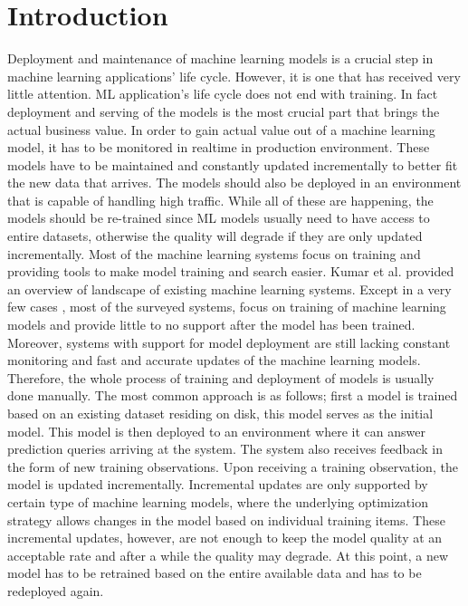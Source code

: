 \documentclass{vldb}
\begin{document}
\section{Introduction} \label{introduction}
Deployment and maintenance of machine learning models is a crucial step in machine learning applications' life cycle. 
However, it is one that has received very little attention. 
ML application's life cycle does not end with training. 
In fact deployment and serving of the models is the most crucial part that brings the actual business value. 
In order to gain actual value out of a machine learning model, it has to be monitored in realtime in production environment. 
These models have to be maintained and constantly updated incrementally to better fit the new data that arrives. 
The models should also be deployed in an environment that is capable of handling high traffic. 
While all of these are happening, the models should be re-trained since ML models usually need to have access to entire datasets, otherwise the quality will degrade if they are only updated incrementally. 
Most of the machine learning systems focus on training and providing tools to make model training and search easier. 
Kumar et al. \cite{kumar2015survey} provided an overview of landscape of existing machine learning systems. 
Except in a very few cases \cite{akdere2011case, crankshaw2014missing}, most of the surveyed systems, focus on training of machine learning models and provide little to no support after the model has been trained.
Moreover, systems with support for model deployment are still lacking constant monitoring and fast and accurate updates of the machine learning models.
Therefore, the whole process of training and deployment of models is usually done manually.
The most common approach is as follows; first a model is trained based on an existing dataset residing on disk, this model serves as the initial model.
This model is then deployed to an environment where it can answer prediction queries arriving at the system.
The system also receives feedback in the form of new training observations.
Upon receiving a training observation, the model is updated incrementally.
Incremental updates are only supported by certain type of machine learning models, where the underlying optimization strategy allows changes in the model based on individual training items.
These incremental updates, however, are not enough to keep the model quality at an acceptable rate and after a while the quality may degrade.
At this point, a new model has to be retrained based on the entire available data and has to be redeployed again.
\end{document}
